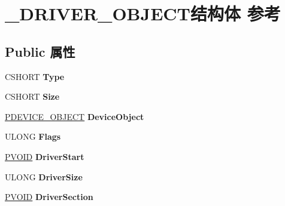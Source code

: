 \hypertarget{struct___d_r_i_v_e_r___o_b_j_e_c_t}{}\section{\+\_\+\+D\+R\+I\+V\+E\+R\+\_\+\+O\+B\+J\+E\+C\+T结构体 参考}
\label{struct___d_r_i_v_e_r___o_b_j_e_c_t}
\subsection*{Public 属性}
\begin{DoxyCompactItemize}
\item 
\mbox{\label{struct___d_r_i_v_e_r___o_b_j_e_c_t_a80102a79b46d8ae8c097b5070ee6654a}} 
C\+S\+H\+O\+RT {\bfseries Type}
\item 
\mbox{\label{struct___d_r_i_v_e_r___o_b_j_e_c_t_a6ce206fa4c79e6f591d07d269956e7b7}} 
C\+S\+H\+O\+RT {\bfseries Size}
\item 
\mbox{\label{struct___d_r_i_v_e_r___o_b_j_e_c_t_aa53b7e6c1566d9260b3d83a77b486af6}} 
\hyperlink{struct___d_e_v_i_c_e___o_b_j_e_c_t}{P\+D\+E\+V\+I\+C\+E\+\_\+\+O\+B\+J\+E\+CT} {\bfseries Device\+Object}
\item 
\mbox{\label{struct___d_r_i_v_e_r___o_b_j_e_c_t_aeeeeb24f7c061f50df72e6d527bd2480}} 
U\+L\+O\+NG {\bfseries Flags}
\item 
\mbox{\label{struct___d_r_i_v_e_r___o_b_j_e_c_t_a15dd1ea21612b2d23087a7791794734a}} 
\hyperlink{interfacevoid}{P\+V\+O\+ID} {\bfseries Driver\+Start}
\item 
\mbox{\label{struct___d_r_i_v_e_r___o_b_j_e_c_t_a794427f841f09f738f8b7d3cdc482b50}} 
U\+L\+O\+NG {\bfseries Driver\+Size}
\item 
\mbox{\label{struct___d_r_i_v_e_r___o_b_j_e_c_t_a3a9528958da88c3aface7225fef57201}} 
\hyperlink{interfacevoid}{P\+V\+O\+ID} {\bfseries Driver\+Section}
\item 

\end{DoxyCompactItemize}
